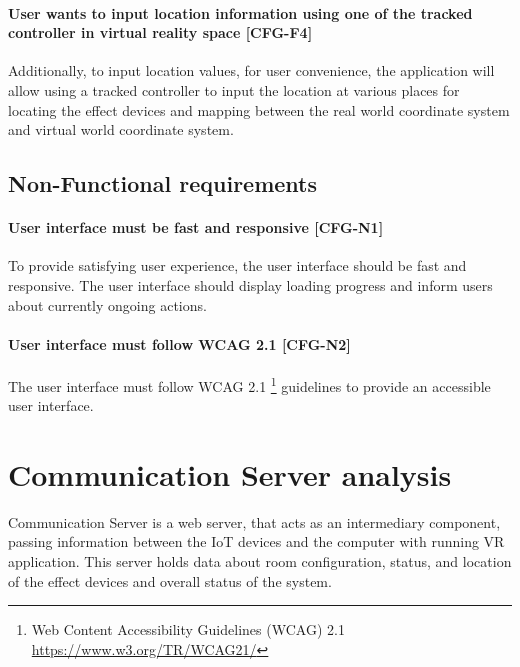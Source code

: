 \hypertarget{x-\textbf{user-wants-to-input-location-information-using-one-of-the-tracked-controller-in-virtual-reality-space}-[cfg-f4]}{\paragraph*{\textbf{User wants to input location information using one of the tracked controller in virtual reality space} [CFG-F4]}}
Additionally, to input location values, for user convenience,
the application will allow using a tracked controller to input the location at
various places for locating the effect
devices and mapping between the real world coordinate system and virtual
world coordinate system.


\subsection*{Non-Functional requirements}
\hypertarget{x-\textbf{user-interface-must-be-fast-and-responsive}-[cfg-n1]}{\paragraph*{\textbf{User interface must be fast and responsive} [CFG-N1]}}
To provide satisfying user experience, the user interface should be fast and
responsive. The user interface should display loading progress and inform users
about currently ongoing actions.


\hypertarget{x-\textbf{user-interface-must-follow-wcag-2.1}-[cfg-n2]}{\paragraph*{\textbf{User interface must follow WCAG 2.1} [CFG-N2]}}
The user interface must follow WCAG 2.1
\footnote{Web Content Accessibility Guidelines (WCAG) 2.1 \href{https://www.w3.org/TR/WCAG21/}{https://www.w3.org/TR/WCAG21/}}
guidelines to provide an accessible user interface.


\hypertarget{x-communication-server-analysis}{\section{Communication Server analysis}}
Communication Server is a web server, that acts as an intermediary component,
passing information between the IoT devices and the computer with
running VR application. This server holds data about room configuration,
status, and location of the effect devices and overall status of the system.


